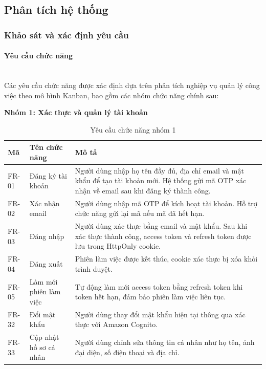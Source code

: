 \subsection{Phân tích hệ thống}

\subsubsection{Khảo sát và xác định yêu cầu}

\paragraph{Yêu cầu chức năng} \mbox{}\\

Các yêu cầu chức năng được xác định dựa trên phân tích nghiệp vụ quản lý công việc theo mô hình Kanban, bao gồm các nhóm chức năng chính sau:

\textbf{Nhóm 1: Xác thực và quản lý tài khoản}

\begin{table}[H]
\centering
\begin{tabular}{|p{1.8cm}|p{4cm}|p{8.2cm}|}
\hline
\textbf{Mã} & \textbf{Tên chức năng} & \textbf{Mô tả} \\
\hline
FR-01 & Đăng ký tài khoản & Người dùng nhập họ tên đầy đủ, địa chỉ email và mật khẩu để tạo tài khoản mới. Hệ thống gửi mã OTP xác nhận về email sau khi đăng ký thành công. \\
\hline
FR-02 & Xác nhận email & Người dùng nhập mã OTP để kích hoạt tài khoản. Hỗ trợ chức năng gửi lại mã nếu mã đã hết hạn. \\
\hline
FR-03 & Đăng nhập & Người dùng xác thực bằng email và mật khẩu. Sau khi xác thực thành công, access token và refresh token được lưu trong HttpOnly cookie. \\
\hline
FR-04 & Đăng xuất & Phiên làm việc được kết thúc, cookie xác thực bị xóa khỏi trình duyệt. \\
\hline
FR-05 & Làm mới phiên làm việc & Tự động làm mới access token bằng refresh token khi token hết hạn, đảm bảo phiên làm việc liên tục. \\
\hline
FR-32 & Đổi mật khẩu & Người dùng thay đổi mật khẩu hiện tại thông qua xác thực với Amazon Cognito. \\
\hline
FR-33 & Cập nhật hồ sơ cá nhân & Người dùng chỉnh sửa thông tin cá nhân như họ tên, ảnh đại diện, số điện thoại và địa chỉ. \\
\hline
\end{tabular}
\caption{Yêu cầu chức năng nhóm 1}
\label{tab:fr_auth}
\end{table}


